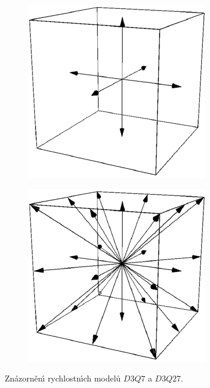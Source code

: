         \begin{figure}[H]
            \centering
                \begin{subfigure}{.5\textwidth}
                    \centering
                \includegraphics[width=.65\textwidth]{Img/Kapitola 2/D3Q7.pdf}
                \label{fig:VelMod2a}
                \end{subfigure}%
                \begin{subfigure}{.5\textwidth}
                \centering
                \includegraphics[width=.65\textwidth]{Img/Kapitola 2/D3Q27.pdf}
                \label{fig:VelMod2b}
                \end{subfigure}
                \caption{Zn\'{a}zorn\v{e}n\'{\i} rychlostn\'{\i}ch model\r{u} $D3Q7$ a $D3Q27$.}
                \label{fig:VelMod}
        \end{figure}

